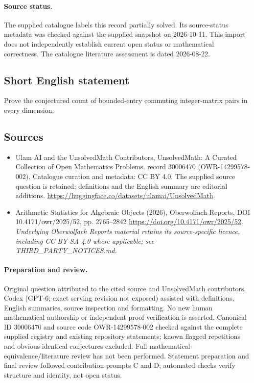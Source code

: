 \documentclass[11pt]{article}
\begin{document}
\paragraph{Source status.}
The supplied catalogue labels this record partially solved. Its source-status metadata was checked against the supplied snapshot on 2026-10-11. This import does not independently establish current open status or mathematical correctness. The catalogue literature assessment is dated 2026-08-22.
\subsection{Short English statement}
Prove the conjectured count of bounded-entry commuting integer-matrix pairs in every dimension.
\subsection{Sources}
\begin{itemize}
\item[S1] Ulam AI and the UnsolvedMath Contributors, UnsolvedMath: A Curated Collection of Open Mathematics Problems, record 30006470 (OWR-14299578-002). Catalogue curation and metadata: CC BY 4.0. The supplied source question is retained; definitions and the English summary are editorial additions.
\url{https://huggingface.co/datasets/ulamai/UnsolvedMath}.
\item[S2] Arithmetic Statistics for Algebraic Objects (2026), Oberwolfach Reports, DOI 10.4171/owr/2025/52, pp. 2765--2842
\url{https://doi.org/10.4171/owr/2025/52}.
\textit{Underlying Oberwolfach Reports material retains its source-specific licence, including CC BY-SA 4.0 where applicable; see THIRD\_PARTY\_NOTICES.md.}
\end{itemize}
\paragraph{Preparation and review.}
Original question attributed to the cited source and UnsolvedMath contributors. Codex (GPT-6; exact serving revision not exposed) assisted with definitions, English summaries, source inspection and formatting. No new human mathematical authorship or independent proof verification is asserted. Canonical ID 30006470 and source code OWR-14299578-002 checked against the complete supplied registry and existing repository statements; known flagged repetitions and obvious identical conjectures excluded. Full mathematical-equivalence/literature review has not been performed. Statement preparation and final review followed contribution prompts C and D; automated checks verify structure and identity, not open status.
\label{end:30006470}
\end{document}

